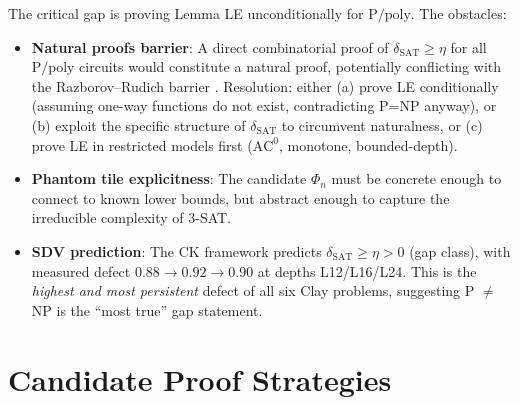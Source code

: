 \documentclass[11pt]{article}
\theoremstyle{definition}
\begin{document}
The critical gap is proving Lemma LE unconditionally for $\mathrm{P/poly}$.
The obstacles:
\begin{itemize}
  \item \textbf{Natural proofs barrier}: A direct combinatorial proof of $\delta_{\mathrm{SAT}} \geq \eta$
    for all $\mathrm{P/poly}$ circuits would constitute a natural proof, potentially
    conflicting with the Razborov--Rudich barrier \cite{RR}.
    Resolution: either (a) prove LE conditionally (assuming one-way functions do not exist,
    contradicting P=NP anyway), or (b) exploit the specific structure of $\delta_{\mathrm{SAT}}$
    to circumvent naturalness, or (c) prove LE in restricted models first
    ($\mathrm{AC}^0$, monotone, bounded-depth).
  \item \textbf{Phantom tile explicitness}: The candidate $\Phi_n$ must be concrete enough
    to connect to known lower bounds, but abstract enough to capture the irreducible
    complexity of 3-SAT.
  \item \textbf{SDV prediction}: The CK framework predicts $\delta_{\mathrm{SAT}} \geq \eta > 0$
    (gap class), with measured defect $0.88 \to 0.92 \to 0.90$ at depths L12/L16/L24.
    This is the \emph{highest and most persistent} defect of all six Clay problems,
    suggesting P $\neq$ NP is the ``most true'' gap statement.
\end{itemize}

\section{Candidate Proof Strategies}
\end{document}
